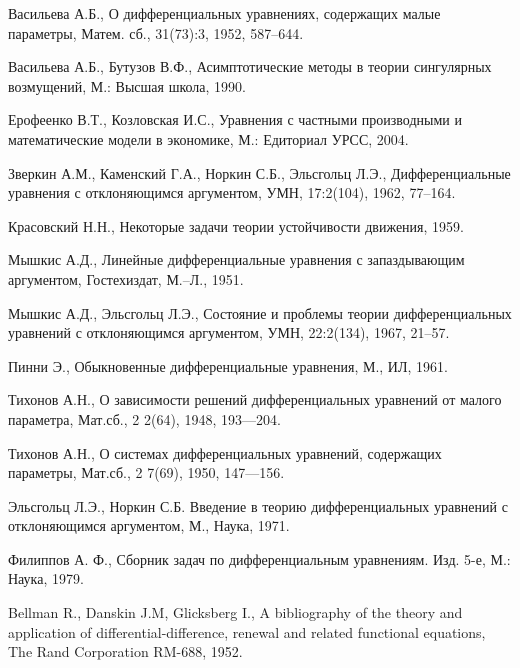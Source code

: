\begin{thebibliography}{99} %



Васильева А.Б., О дифференциальных уравнениях, содержащих малые параметры, Матем. сб., 31(73):3, 1952, 587–644.

Васильева А.Б., Бутузов В.Ф., Асимптотические методы в теории сингулярных возмущений, М.: Высшая школа, 1990.

Ерофеенко В.Т., Козловская И.С., Уравнения с частными производными и математические модели в экономике, М.: Едиториал УРСС, 2004.

Зверкин А.М., Каменский Г.А., Норкин С.Б., Эльсгольц Л.Э., Дифференциальные уравнения с отклоняющимся аргументом, УМН, 17:2(104), 1962, 77–164.

Красовский Н.Н., Некоторые задачи теории устойчивости движения, 1959.

Мышкис А.Д., Линейные дифференциальные уравнения с запаздывающим аргументом, Гостехиздат, М.–Л., 1951.

Мышкис А.Д., Эльсгольц Л.Э., Состояние и проблемы теории дифференциальных уравнений с отклоняющимся аргументом, УМН, 22:2(134), 1967, 21–57.

Пинни Э., Обыкновенные дифференциальные уравнения, М., ИЛ, 1961.

Тихонов А.Н., О зависимости решений дифференциальных уравнений от малого параметра, Мат.сб., 2 2(64), 1948, 193—204.

Тихонов А.Н., О системах дифференциальных уравнений, содержащих параметры, Мат.сб., 2 7(69), 1950, 147—156.

Эльсгольц Л.Э., Норкин С.Б. Введение в теорию дифференциальных уравнений с отклоняющимся аргументом, М., Наука, 1971.

Филиппов А. Ф., Сборник задач по дифференциальным уравнениям. Изд. 5-е, М.: Наука, 1979.


Bellman R., Danskin J.M, Glicksberg I., A bibliography of the theory and application of differential-difference, renewal and related functional equations, The Rand Corporation RM-688, 1952.


\end{thebibliography}
